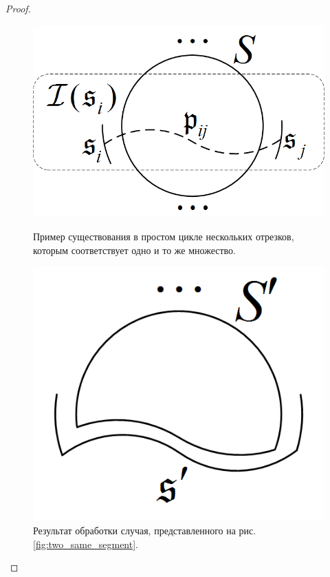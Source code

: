 \begin{proof}
\begin{figure}[htb!]
\centering
\begin{minipage}[t]{0.4\textwidth}
\centering
\includegraphics[scale=1.0]{images/two_same_segment.png}
\caption{Пример существования в простом цикле нескольких отрезков, которым соответствует одно и то же множество.}
\label{fig:two_same_segment}
\end{minipage}
\hspace{0.5cm}
\begin{minipage}[t]{0.4\textwidth}
\centering
\includegraphics[scale=1.0]{images/two_same_segment_2.png}
\caption{Результат обработки случая, представленного на рис. \ref{fig:two_same_segment}.}
\label{fig:two_same_segment_2}
\end{minipage}
\end{figure}


\end{proof}
